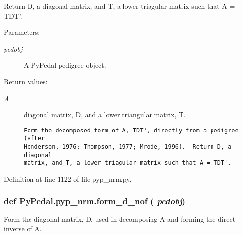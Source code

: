 Return D, a diagonal matrix, and T, a lower triagular matrix such that A = TDT'. \begin{Desc}
\item[Parameters:]
\begin{description}
\item[{\em pedobj}]A Py\-Pedal pedigree object. \end{description}
\end{Desc}
\begin{Desc}
\item[Return values:]
\begin{description}
\item[{\em A}]diagonal matrix, D, and a lower triangular matrix, T.

\footnotesize\begin{verbatim}Form the decomposed form of A, TDT', directly from a pedigree (after
Henderson, 1976; Thompson, 1977; Mrode, 1996).  Return D, a diagonal
matrix, and T, a lower triagular matrix such that A = TDT'.
\end{verbatim}
\normalsize
 \end{description}
\end{Desc}


Definition at line 1122 of file pyp\_\-nrm.py.\hypertarget{namespacePyPedal_1_1pyp__nrm_43df241a5d555995a4bc7d3fd2ff01bf}{
\subsubsection[form\_\-d\_\-nof]{\setlength{\rightskip}{0pt plus 5cm}def Py\-Pedal.pyp\_\-nrm.form\_\-d\_\-nof ( {\em pedobj})}}
\label{namespacePyPedal_1_1pyp__nrm_43df241a5d555995a4bc7d3fd2ff01bf}


Form the diagonal matrix, D, used in decomposing A and forming the direct inverse of A. 

